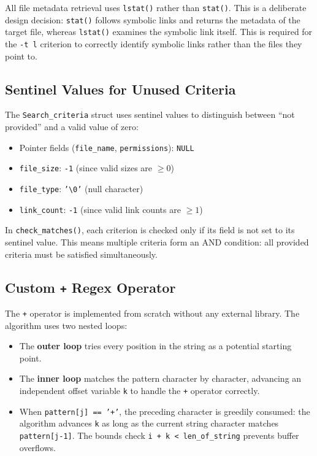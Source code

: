 \documentclass[12pt, a4paper]{article}
\begin{document}
All file metadata retrieval uses \texttt{lstat()} rather than \texttt{stat()}. This is a deliberate
design decision: \texttt{stat()} follows symbolic links and returns the metadata of the target
file, whereas \texttt{lstat()} examines the symbolic link itself. This is required for the
\texttt{-t l} criterion to correctly identify symbolic links rather than the files they point to.

\subsection{Sentinel Values for Unused Criteria}

The \texttt{Search\_criteria} struct uses sentinel values to distinguish between ``not provided''
and a valid value of zero:

\begin{itemize}[noitemsep]
    \item Pointer fields (\texttt{file\_name}, \texttt{permissions}): \texttt{NULL}
    \item \texttt{file\_size}: \texttt{-1} (since valid sizes are $\geq 0$)
    \item \texttt{file\_type}: \texttt{'\textbackslash0'} (null character)
    \item \texttt{link\_count}: \texttt{-1} (since valid link counts are $\geq 1$)
\end{itemize}

In \texttt{check\_matches()}, each criterion is checked only if its field is not set to its
sentinel value. This means multiple criteria form an AND condition: all provided criteria
must be satisfied simultaneously.

\subsection{Custom \texttt{+} Regex Operator}

The \texttt{+} operator is implemented from scratch without any external library.
The algorithm uses two nested loops:

\begin{itemize}[noitemsep]
    \item The \textbf{outer loop} tries every position in the string as a potential starting point.
    \item The \textbf{inner loop} matches the pattern character by character, advancing an independent
          offset variable \texttt{k} to handle the \texttt{+} operator correctly.
    \item When \texttt{pattern[j] == '+'}, the preceding character is greedily consumed: the
          algorithm advances \texttt{k} as long as the current string character matches
          \texttt{pattern[j-1]}. The bounds check \texttt{i + k < len\_of\_string} prevents
          buffer overflows.
\end{itemize}
\end{document}
